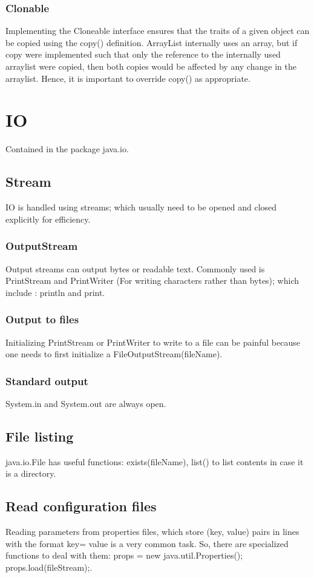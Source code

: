 \documentclass[oneside, article]{memoir}
\begin{document}
\subsubsection{Clonable}
Implementing the Cloneable interface ensures that the traits of a given object can be copied using the copy() definition. ArrayList internally uses an array, but if copy were implemented such that only the reference to the internally used arraylist were copied, then both copies would be affected by any change in the arraylist. Hence, it is important to override copy() as appropriate.

\section{IO}
Contained in the package java.io.

\subsection{Stream}
IO is handled using streams; which usually need to be opened and closed explicitly for efficiency.

\subsubsection{OutputStream}
Output streams can output bytes or readable text. Commonly used is PrintStream and PrintWriter (For writing characters rather than bytes); which include : println and print.

\subsubsection{Output to files}
Initializing PrintStream or PrintWriter to write to a file can be painful because one needs to first initialize a FileOutputStream(fileName).

\subsubsection{Standard output}
System.in and System.out are always open.

\subsection{File listing}
java.io.File has useful functions: exists(fileName), list() to list contents in case it is a directory.

\subsection{Read configuration files}
Reading parameters from properties files, which store (key, value) pairs in lines with the format key= value is a very common task. So, there are specialized functions to deal with them: props = new java.util.Properties();  props.load(fileStream);.
\end{document}
